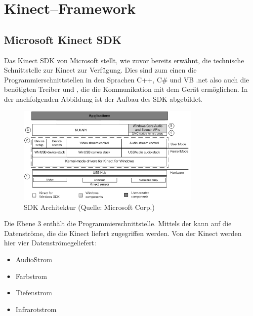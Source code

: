 \chapter{Kinect--Framework}
\label{chap:Kinect}

\section{Microsoft Kinect SDK}


Das Kinect SDK von Microsoft stellt, wie zuvor bereits erw\"ahnt, die technische Schnittstelle zur Kinect zur Verf\"ugung. 
Dies sind zum einen die Programmierschnittstellen in den Sprachen C++, C\# und VB .net also auch die ben\"otigten Treiber 
und , die die Kommunikation mit dem Ger\"at erm\"oglichen. 
In der nachfolgenden Abbildung ist der Aufbau des SDK abgebildet.
\par\smallskip 
\begin{figure}[htb]
\centering
\includegraphics[width=0.8\textwidth]{img/04kapitel/sdk.png}
\caption[SDK Architektur]{SDK Architektur (Quelle: Microsoft Corp.\footnotemark[1])}
\label{fig:SDK Architecture}
\end{figure}
\par\smallskip 
Die Ebene 3 enth\"alt die Programmierschnittstelle. Mittels der   kann auf die 
Datenstr\"ome, die die Kinect liefert zugegriffen werden. Von der Kinect werden hier vier Datenstr\"ome\footnotemark[2] geliefert: 
\begin{itemize}
  \item AudioStrom
  \item Farbstrom
  \item Tiefenstrom
  \item Infrarotstrom
\end{itemize}
